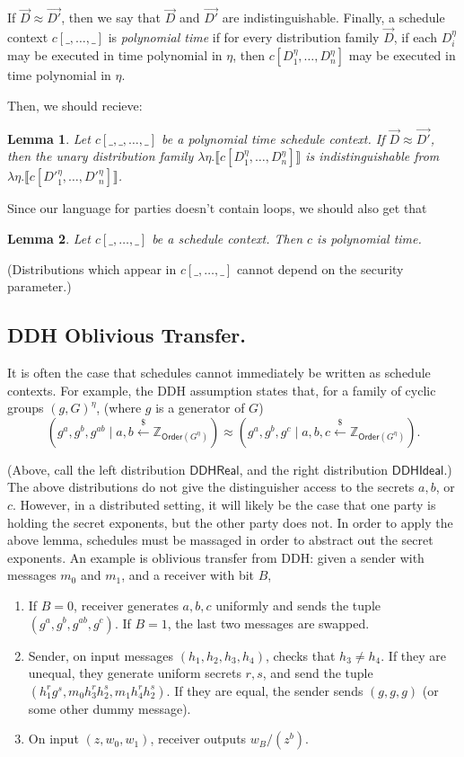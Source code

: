 \documentclass{article}
\newtheorem{lemma}{Lemma}
\begin{document}
If $\vec{D} \approx \vec{D'}$, then we say that $\vec{D}$ and $\vec{D'}$ are indistinguishable.
Finally, a schedule context $c[\_, \dots, \_]$ is \emph{polynomial time} if for every distribution family $\vec{D}$, if each $D_i^\eta$ may be executed in time polynomial in $\eta$, then $c[D_1^\eta, \dots, D_n^\eta]$ may be executed in time polynomial in $\eta$.

Then, we should recieve:
\begin{lemma}
    Let $c[\_, \_, \dots, \_]$ be a polynomial time schedule context. If $\vec{D} \approx \vec{D'}$, then the unary distribution family $\lambda \eta. \llbracket c[D_1^\eta, \dots, D_n^\eta] \rrbracket$ is indistinguishable from $\lambda \eta. \llbracket c[D'^\eta_1, \dots, D'^\eta_n] \rrbracket$.
\end{lemma}

Since our language for parties doesn't contain loops, we should also get that
\begin{lemma}
    Let $c[\_, \dots, \_]$ be a schedule context. Then $c$ is polynomial time.
\end{lemma}

(Distributions which appear in $c[\_, \dots, \_]$ cannot depend on the security parameter.)

\subsection{DDH Oblivious Transfer.}
It is often the case that schedules cannot immediately be written as schedule contexts. For example, the DDH assumption states that, for a family of cyclic groups $(g,G)^\eta$, (where $g$ is a generator of $G$)
\[(g^a, g^b, g^{ab} \mid a,b \xleftarrow{\$} \mathbb{Z}_{\mathsf{Order}(G^\eta)}) \approx (g^a, g^b, g^c \mid a,b,c \xleftarrow{\$} \mathbb{Z}_{\textsf{Order}(G^\eta)}).\]

(Above, call the left distribution $\mathsf{DDHReal}$, and the right distribution $\mathsf{DDHIdeal}$.)
The above distributions do not give the distinguisher access to the secrets $a,b$, or $c$. However, in a distributed setting, it will likely be the case that one party is holding the secret exponents, but the other party does not. In order to apply the above lemma, schedules must be massaged in order to abstract out the secret exponents. An example is oblivious transfer from DDH: given a sender with messages $m_0$ and $m_1$, and a receiver with bit $B$,


\begin{enumerate}
    \item If $B=0$, receiver generates $a,b,c$ uniformly and sends the tuple $(g^a, g^b, g^{ab}, g^c)$. If $B=1$, the last two messages are swapped.
    \item Sender, on input messages $(h_1, h_2, h_3, h_4)$, checks that $h_3 \neq h_4$. If they are unequal, they generate uniform secrets $r,s$, and send the tuple $(h_1^r g^s, m_0 h_3^r h_2^s, m_1 h_4^r h_2^s)$. If they are equal, the sender sends $(g, g, g)$ (or some other dummy message).
    \item On input $(z, w_0, w_1)$, receiver outputs $w_B / (z^b)$.
\end{enumerate}
\end{document}
